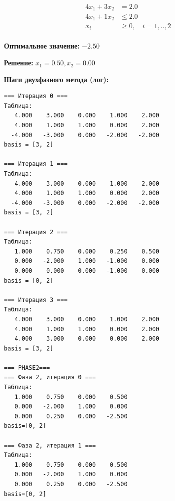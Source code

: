 \documentclass[a4paper,12pt]{article}
\begin{document}
\[ \begin{aligned}
4x_{1} +3x_{2} &= 2.0 \\
4x_{1} +1x_{2} &\le 2.0 \\
x_i &\ge 0,\quad i=1,..,2\\
\end{aligned}\]

\textbf{Оптимальное значение: }$-2.50$

\textbf{Решение: }$x_{1}=0.50, x_{2}=0.00$

\textbf{Шаги двухфазного метода (лог):}

\begin{verbatim}
=== Итерация 0 ===
Таблица:
   4.000    3.000    0.000    1.000    2.000
   4.000    1.000    1.000    0.000    2.000
  -4.000   -3.000    0.000   -2.000   -2.000
basis = [3, 2]

=== Итерация 1 ===
Таблица:
   4.000    3.000    0.000    1.000    2.000
   4.000    1.000    1.000    0.000    2.000
  -4.000   -3.000    0.000   -2.000   -2.000
basis = [3, 2]

=== Итерация 2 ===
Таблица:
   1.000    0.750    0.000    0.250    0.500
   0.000   -2.000    1.000   -1.000    0.000
   0.000    0.000    0.000   -1.000    0.000
basis = [0, 2]

=== Итерация 3 ===
Таблица:
   4.000    3.000    0.000    1.000    2.000
   4.000    1.000    1.000    0.000    2.000
   4.000    3.000    0.000    0.000    2.000
basis = [3, 2]

=== PHASE2===
=== Фаза 2, итерация 0 ===
Таблица:
   1.000    0.750    0.000    0.500
   0.000   -2.000    1.000    0.000
   0.000    0.250    0.000   -2.500
basis=[0, 2]

=== Фаза 2, итерация 1 ===
Таблица:
   1.000    0.750    0.000    0.500
   0.000   -2.000    1.000    0.000
   0.000    0.250    0.000   -2.500
basis=[0, 2]

\end{verbatim}
\end{document}
